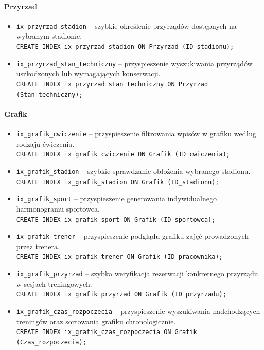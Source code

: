 \documentclass[11pt,a4paper]{article}
\begin{document}
\paragraph{Przyrzad}
\begin{itemize}
    \item \texttt{ix\_przyrzad\_stadion} -- szybkie określenie przyrządów dostępnych na wybranym stadionie.\\
    \texttt{CREATE INDEX ix\_przyrzad\_stadion ON Przyrzad (ID\_stadionu);}
    \item \texttt{ix\_przyrzad\_stan\_techniczny} -- przyspieszenie wyszukiwania przyrządów uszkodzonych lub wymagających konserwacji.\\
    \texttt{CREATE INDEX ix\_przyrzad\_stan\_techniczny ON Przyrzad (Stan\_techniczny);}
\end{itemize}

\paragraph{Grafik}
\begin{itemize}
    \item \texttt{ix\_grafik\_cwiczenie} -- przyspieszenie filtrowania wpisów w grafiku według rodzaju ćwiczenia.\\
    \texttt{CREATE INDEX ix\_grafik\_cwiczenie ON Grafik (ID\_cwiczenia);}
    \item \texttt{ix\_grafik\_stadion} -- szybkie sprawdzanie obłożenia wybranego stadionu.\\
    \texttt{CREATE INDEX ix\_grafik\_stadion ON Grafik (ID\_stadionu);}
    \item \texttt{ix\_grafik\_sport} -- przyspieszenie generowania indywidualnego harmonogramu sportowca.\\
    \texttt{CREATE INDEX ix\_grafik\_sport ON Grafik (ID\_sportowca);}
    \item \texttt{ix\_grafik\_trener} -- przyspieszenie podglądu grafiku zajęć prowadzonych przez trenera.\\
    \texttt{CREATE INDEX ix\_grafik\_trener ON Grafik (ID\_pracownika);}
    \item \texttt{ix\_grafik\_przyrzad} -- szybka weryfikacja rezerwacji konkretnego przyrządu w sesjach treningowych.\\
    \texttt{CREATE INDEX ix\_grafik\_przyrzad ON Grafik (ID\_przyrzadu);}
    \item \texttt{ix\_grafik\_czas\_rozpoczecia} -- przyspieszenie wyszukiwania nadchodzących treningów oraz sortowania grafiku chronologicznie.\\
    \texttt{CREATE INDEX ix\_grafik\_czas\_rozpoczecia ON Grafik (Czas\_rozpoczecia);}
\end{itemize}
\end{document}
